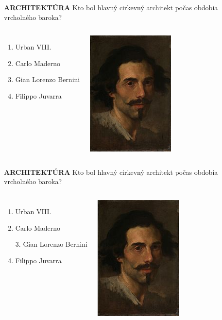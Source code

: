 \documentclass[dvipsnames]{beamer}
\begin{document}
\begin{frame}
	\textbf{ARCHITEKTÚRA}
	\vskip 3mm
	Kto bol hlavný cirkevný architekt počas obdobia vrcholného baroka?
	\begin{columns}
	\begin{enumerate}
		\item Urban VIII.
		\item Carlo Maderno
		\item Gian Lorenzo Bernini
		\item Filippo Juvarra
	\end{enumerate}
		\includegraphics[scale=1]{bern}

	\end{columns}
\end{frame}
\begin{frame}
	\textbf{ARCHITEKTÚRA}
	\vskip 3mm
	Kto bol hlavný cirkevný architekt počas obdobia vrcholného baroka?
	\begin{columns}
	\column{0.5\textwidth}
	\begin{enumerate}
		\item Urban VIII.
		\item Carlo Maderno
		\item[\textcolor{g}{3.}] \textcolor{g}{Gian Lorenzo Bernini}\setcounter{enumi}{3}
		\item Filippo Juvarra
	\end{enumerate}
	\column{0.5\textwidth}
		\includegraphics[scale=1]{bern}

	\end{columns}
\end{frame}
\end{document}
